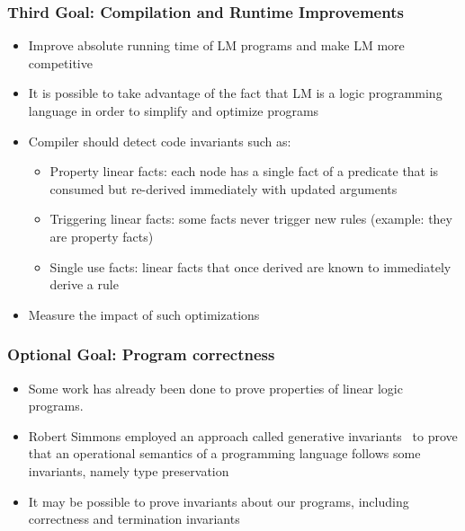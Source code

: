 \documentclass{beamer}
\begin{document}
\begin{frame}[fragile]
   \frametitle{Third Goal: Compilation and Runtime Improvements}
   \begin{itemize}
      \item Improve absolute running time of LM programs and make LM more competitive
      \item It is possible to take advantage of the fact that LM is a logic programming language in order to simplify and optimize programs
      \item Compiler should detect code invariants such as:
      \begin{itemize}
         \item Property linear facts: each node has a single fact of a predicate that is consumed but re-derived immediately with updated arguments
         \item Triggering linear facts: some facts never trigger new rules (example: they are property facts)
         \item Single use facts: linear facts that once derived are known to immediately derive a rule
      \end{itemize}
      \item Measure the impact of such optimizations
   \end{itemize}
\end{frame}

\begin{frame}[fragile]
   \frametitle{Optional Goal: Program correctness}
   \begin{itemize}
      \item Some work has already been done to prove properties of linear logic programs.
      \item Robert Simmons employed an approach called generative invariants~\cite{simmons:Thesis} to prove that an operational semantics of a programming language follows some invariants, namely type preservation
      \item It may be possible to prove invariants about our programs, including correctness and termination invariants
   \end{itemize}
\end{frame}
\end{document}
